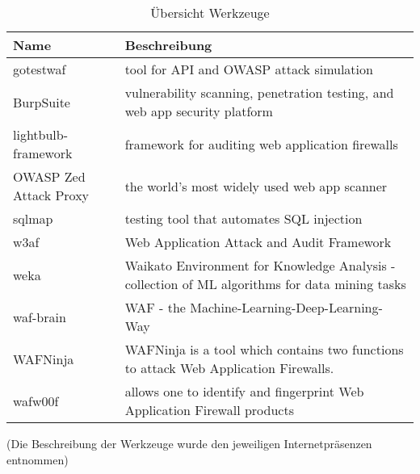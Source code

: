 \begin{table}[h]
  \centering
  \begin{tabular}{|l | p{7cm} |}
    \hline
    \textbf{Name} & \textbf{Beschreibung} \\
    \hline
    gotestwaf & tool for API and OWASP attack simulation \\
    BurpSuite & vulnerability scanning, penetration testing, and web app security platform\\
    lightbulb-framework & framework for auditing web application firewalls \\
    OWASP Zed Attack Proxy & the world's most widely used web app scanner \\
    sqlmap & testing tool that automates SQL injection\\
    w3af & Web Application Attack and Audit Framework\\
    weka & Waikato Environment for Knowledge Analysis - collection of ML algorithms for data mining tasks\\
    waf-brain & WAF - the Machine-Learning-Deep-Learning-Way\\
    WAFNinja &  WAFNinja is a tool which contains two functions to attack Web Application Firewalls. \\
    wafw00f & allows one to identify and fingerprint Web Application Firewall products\\
    \hline
  \end{tabular}
  
  \caption{Übersicht Werkzeuge}
  \medskip
  \small
  (Die Beschreibung der Werkzeuge wurde den jeweiligen Internetpräsenzen entnommen)
  \label{tab:my_tools}
\end{table}

